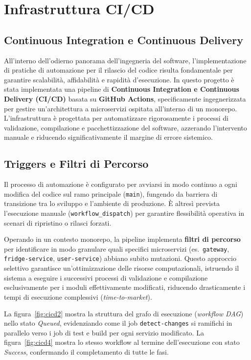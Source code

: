 \documentclass[12pt,a4paper,twoside]{report}
\begin{document}
\newpage
\chapter{Infrastruttura CI/CD}

\section{Continuous Integration e Continuous Delivery}

All'interno dell'odierno panorama dell'ingegneria del software, l'implementazione di pratiche di automazione per il rilascio del codice risulta fondamentale per garantire scalabilità, affidabilità e rapidità d'esecuzione. In questo progetto è stata implementata una pipeline di \textbf{Continuous Integration e Continuous Delivery (CI/CD)} basata su \textbf{GitHub Actions}, specificamente ingegnerizzata per gestire un'architettura a microservizi ospitata all'interno di un monorepo. L'infrastruttura è progettata per automatizzare rigorosamente i processi di validazione, compilazione e pacchettizzazione del software, azzerando l'intervento manuale e riducendo significativamente il margine di errore sistemico.

\section{Triggers e Filtri di Percorso}

Il processo di automazione è configurato per avviarsi in modo continuo a ogni modifica del codice sul ramo principale (\texttt{main}), fungendo da barriera di transizione tra lo sviluppo e l'ambiente di produzione. È altresì prevista l'esecuzione manuale (\texttt{workflow\_dispatch}) per garantire flessibilità operativa in scenari di ripristino o rilasci forzati.

Operando in un contesto monorepo, la pipeline implementa \textbf{filtri di percorso} per identificare in modo granulare quali specifici microservizi (es.\ \texttt{gateway}, \texttt{fridge-service}, \texttt{user-service}) abbiano subito mutazioni. Questo approccio selettivo garantisce un'ottimizzazione delle risorse computazionali, istruendo il sistema a eseguire i successivi processi di validazione e compilazione esclusivamente per i moduli effettivamente modificati, riducendo drasticamente i tempi di esecuzione complessivi (\textit{time-to-market}).

La figura~\ref{fig:cicd2} mostra la struttura del grafo di esecuzione (\textit{workflow DAG}) nello stato \textit{Queued}, evidenziando come il job \texttt{detect-changes} si ramifichi in parallelo verso i job di test e build per ogni servizio modificato. La figura~\ref{fig:cicd4} mostra lo stesso workflow al termine dell'esecuzione con stato \textit{Success}, confermando il completamento di tutte le fasi.
\end{document}
